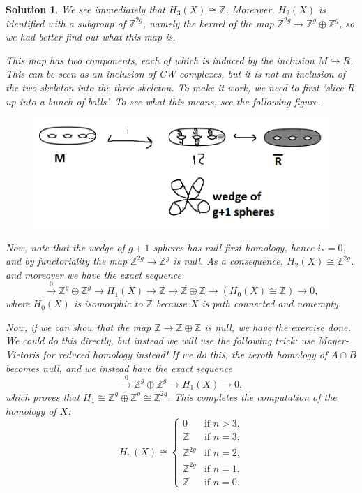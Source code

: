 \documentclass{article}
\theoremstyle{plain}
\theoremstyle{nonumberplain}
\newtheorem{sol}{Solution}
\newcommand{\Z}{\mathbb{Z}}
\begin{document}
\begin{sol}
We see immediately that $H_3(X) \cong \Z$. Moreover, $H_2(X)$ is identified with a subgroup of $\Z^{2g}$, namely the kernel of the map $\Z^{2g} \to \Z^g \oplus \Z^g$, so we had better find out what this map is.

This map has two components, each of which is induced by the inclusion $M \hookrightarrow R$. This can be seen as an inclusion of CW complexes, but it is not an inclusion of the two-skeleton into the three-skeleton. To make it work, we need to first `slice $R$ up into a bunch of balls'. To see what this means, see the following figure.
\begin{figure}[H]
\centering
\includegraphics[width=\linewidth]{mt3}
\end{figure}

Now, note that the wedge of $g+1$ spheres has null first homology, hence $i_* = 0$, and by functoriality the map $\Z^{2g} \to \Z^g$ is null. As a consequence, $H_2(X) \cong \Z^{2g}$, and moreover we have the exact sequence
\begin{equation}
\xrightarrow{0} \Z^g \oplus \Z^g \to H_1(X) \to \Z \to \Z \oplus \Z \to (H_0(X) \cong \Z) \to 0,
\end{equation}
where $H_0(X)$ is isomorphic to $\Z$ because $X$ is path connected and nonempty.

Now, if we can show that the map $\Z \to \Z \oplus \Z$ is null, we have the exercise done. We could do this directly, but instead we will use the following trick: use Mayer-Vietoris for reduced homology instead! If we do this, the zeroth homology of $A \cap B$ becomes null, and we instead have the exact sequence
\begin{equation}
\xrightarrow{0} \Z^g \oplus \Z^g \to H_1(X) \to 0,
\end{equation}
which proves that $H_1 \cong \Z^g \oplus \Z^g \cong \Z^{2g}$. This completes the computation of the homology of $X$:
\begin{equation}
H_n(X) \cong \begin{cases}
0 & \text{if $n > 3$,}\\
\Z & \text{if $n = 3$,}\\
\Z^{2g} & \text{if $n = 2$,}\\
\Z^{2g} & \text{if $n = 1$,}\\
\Z & \text{if $n = 0$.}
\end{cases}
\end{equation}


\end{sol}
\end{document}

